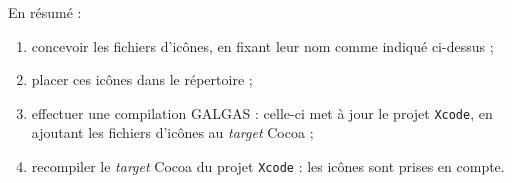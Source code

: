 En résumé :
\begin{enumerate}
  \item concevoir les fichiers d'icônes, en fixant leur nom comme indiqué ci-dessus ;
  \item placer ces icônes dans le répertoire  ;
  \item effectuer une compilation GALGAS : celle-ci met à jour le projet \texttt{Xcode}, en ajoutant les fichiers d'icônes au \emph{target} Cocoa ;
  \item recompiler le \emph{target} Cocoa du projet \texttt{Xcode} : les icônes sont prises en compte.
\end{enumerate}











%
%
%
%
%
%
%
%
%






